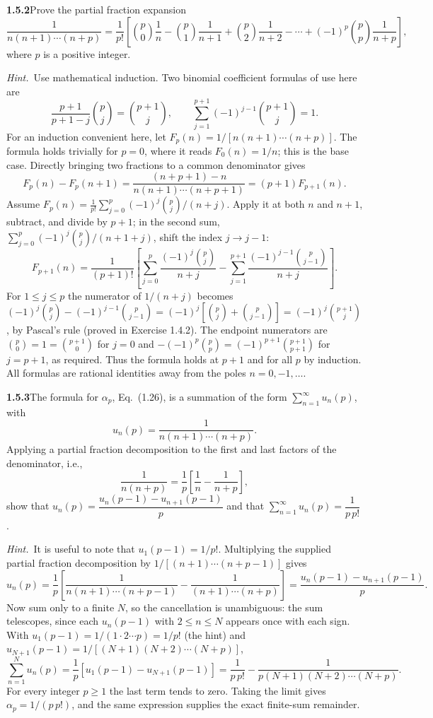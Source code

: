 \par\bigskip
\noindent\textbf{1.5.2}\quad Prove the partial fraction expansion
\[
\frac{1}{n(n+1)\cdots(n+p)}
=\frac{1}{p!}\left[\binom{p}{0}\frac{1}{n}-\binom{p}{1}\frac{1}{n+1}
+\binom{p}{2}\frac{1}{n+2}-\cdots+(-1)^{p}\binom{p}{p}\frac{1}{n+p}\right],
\]
where $p$ is a positive integer.

\emph{Hint.}~Use mathematical induction. Two binomial coefficient formulas of
use here are
\[
\frac{p+1}{p+1-j}\binom{p}{j}=\binom{p+1}{j},\qquad
\sum_{j=1}^{p+1}(-1)^{j-1}\binom{p+1}{j}=1.
\]
\solution
For an induction convenient here, let $F_p(n)=1/[n(n+1)\cdots(n+p)]$.
The formula holds trivially for $p=0$, where it reads $F_0(n)=1/n$;
this is the base case.
Directly bringing two fractions to a common denominator gives
\[
 F_p(n)-F_p(n+1)
 =\frac{(n+p+1)-n}{n(n+1)\cdots(n+p+1)}
 =(p+1)F_{p+1}(n).
\]
Assume $F_p(n)=\frac1{p!}\sum_{j=0}^p(-1)^j\binom pj/(n+j)$.
Apply it at both $n$ and $n+1$, subtract, and divide by $p+1$; in the
second sum, $\sum_{j=0}^p(-1)^j\binom pj/(n+1+j)$, shift the index
$j\to j-1$:
\[
 F_{p+1}(n)=\frac1{(p+1)!}
 \left[\sum_{j=0}^p\frac{(-1)^j\binom pj}{n+j}
 -\sum_{j=1}^{p+1}\frac{(-1)^{j-1}\binom p{j-1}}{n+j}\right].
\]
For $1\le j\le p$ the numerator of $1/(n+j)$ becomes
$(-1)^j\binom pj-(-1)^{j-1}\binom p{j-1}
=(-1)^j[\binom pj+\binom p{j-1}]=(-1)^j\binom{p+1}j$,
by Pascal's rule (proved in Exercise 1.4.2).
The endpoint numerators are $\binom p0=1=\binom{p+1}0$ for $j=0$ and
$-(-1)^p\binom pp=(-1)^{p+1}\binom{p+1}{p+1}$ for $j=p+1$, as required.
Thus the formula holds at $p+1$ and for all $p$ by induction.
All formulas are rational identities away from the poles $n=0,-1,\ldots$.


\par\bigskip
\noindent\textbf{1.5.3}\quad The formula for $\alpha_{p}$, Eq.~(1.26), is a
summation of the form $\sum_{n=1}^{\infty}u_{n}(p)$, with
\[
u_{n}(p)=\frac{1}{n(n+1)\cdots(n+p)}.
\]
Applying a partial fraction decomposition to the first and last factors of
the denominator, i.e.,
\[
\frac{1}{n(n+p)}=\frac{1}{p}\left[\frac{1}{n}-\frac{1}{n+p}\right],
\]
show that $u_{n}(p)=\dfrac{u_{n}(p-1)-u_{n+1}(p-1)}{p}$ and that
$\sum_{n=1}^{\infty}u_{n}(p)=\dfrac{1}{p\,p!}$.

\emph{Hint.}~It is useful to note that $u_{1}(p-1)=1/p!$.
\solution
Multiplying the supplied partial fraction decomposition by
$1/[(n+1)\cdots(n+p-1)]$ gives
\[
 u_n(p)=\frac1p\left[
 \frac1{n(n+1)\cdots(n+p-1)}
 -\frac1{(n+1)\cdots(n+p)}\right]
 =\frac{u_n(p-1)-u_{n+1}(p-1)}p.
\]
Now sum only to a finite $N$, so the cancellation is unambiguous: the
sum telescopes, since each $u_n(p-1)$ with $2\le n\le N$ appears once
with each sign. With $u_1(p-1)=1/(1\cdot2\cdots p)=1/p!$ (the hint) and
$u_{N+1}(p-1)=1/[(N+1)(N+2)\cdots(N+p)]$,
\[
 \sum_{n=1}^N u_n(p)
 =\frac1p[u_1(p-1)-u_{N+1}(p-1)]
 =\frac1{p\,p!}-\frac1{p(N+1)(N+2)\cdots(N+p)}.
\]
For every integer $p\ge1$ the last term tends to zero. Taking the limit
gives $\alpha_p=1/(p\,p!)$, and the same expression supplies the exact
finite-sum remainder.


